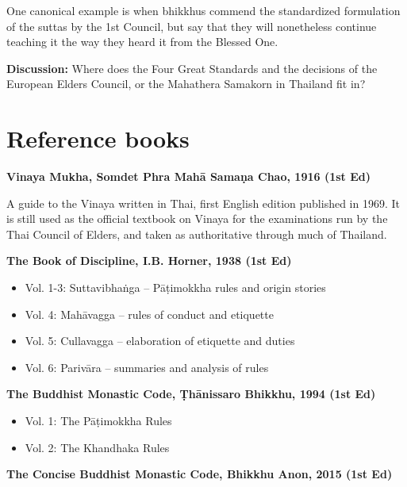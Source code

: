 One canonical example is when bhikkhus commend the standardized
formulation of the suttas by the 1st Council, but say that they will
nonetheless continue teaching it the way they heard it from the Blessed
One.

\textbf{Discussion:} Where does the Four Great Standards and the
decisions of the European Elders Council, or the Mahathera Samakorn in
Thailand fit in?

\section{Reference books}

\textbf{Vinaya Mukha, Somdet Phra Mahā Samaṇa Chao, 1916 (1st Ed)}

A guide to the Vinaya written in Thai, first English edition published
in 1969. It is still used as the official textbook on Vinaya for the
examinations run by the Thai Council of Elders, and taken as
authoritative through much of Thailand.

\textbf{The Book of Discipline, I.B. Horner, 1938 (1st Ed)}

\begin{itemize}
\tightlist
\item
  Vol. 1-3: Suttavibhaṅga -- Pāṭimokkha rules and origin stories
\item
  Vol. 4: Mahāvagga -- rules of conduct and etiquette
\item
  Vol. 5: Cullavagga -- elaboration of etiquette and duties
\item
  Vol. 6: Parivāra -- summaries and analysis of rules
\end{itemize}

\textbf{The Buddhist Monastic Code, Ṭhānissaro Bhikkhu, 1994 (1st Ed)}

\begin{itemize}
\tightlist
\item
  Vol. 1: The Pāṭimokkha Rules
\item
  Vol. 2: The Khandhaka Rules
\end{itemize}

\textbf{The Concise Buddhist Monastic Code, Bhikkhu Anon, 2015 (1st Ed)}

